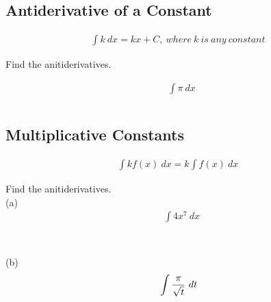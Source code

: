\subsection{Antiderivative of a Constant}

\begin{theorem}
    \begin{align}
        \int k \ dx = kx + C,\ where\ k\ is\ any\ constant
    \end{align}
\end{theorem}

\begin{exercise}\nonumber
    Find the anitiderivatives.

    \begin{align}
         & \int \pi \ dx \\
        \\
    \end{align}
\end{exercise}

\subsection{Multiplicative Constants}

\begin{theorem}
    \begin{align}
        \int kf(x) \ dx = k \int f(x) \ dx
    \end{align}
\end{theorem}

\begin{exercise}\nonumber
    Find the anitiderivatives. \\

    (a)
    \begin{align}
         & \int 4x^7 \ dx \\
        \\
        \\
        \\
        \\
    \end{align}

    (b)
    \begin{align}
         & \int {\pi \over \sqrt{t}} \ dt \\
        \\
        \\
        \\
        \\
    \end{align}
\end{exercise}

